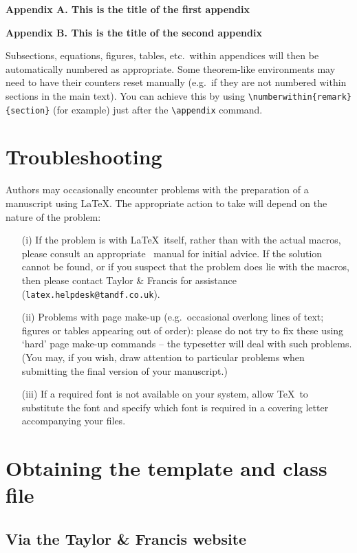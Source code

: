 \documentclass[]{interact}
\theoremstyle{plain}%
\theoremstyle{definition}
\theoremstyle{remark}
\begin{document}
\noindent\textbf{Appendix A. This is the title of the first appendix}\medskip

\noindent\textbf{Appendix B. This is the title of the second appendix}\medskip

\noindent Subsections, equations, figures, tables, etc.\ within appendices will then be automatically numbered as appropriate. Some theorem-like environments may need to have their counters reset manually (e.g.\ if they are not numbered within sections in the main text). You can achieve this by using \verb"\numberwithin{remark}{section}" (for example) just after the \verb"\appendix" command.


\appendix

\section{Troubleshooting}

Authors may occasionally encounter problems with the preparation of a manuscript using \LaTeX. The appropriate action to take will depend on the nature of the problem:
\begin{enumerate}
\item[(i)] If the problem is with \LaTeX\ itself, rather than with the actual macros, please consult an appropriate \LaTeXe\ manual for initial advice. If the solution cannot be found, or if you suspect that the problem does lie with the macros, then please contact Taylor \& Francis for assistance (\texttt{latex.helpdesk@tandf.co.uk}).
\item[(ii)] Problems with page make-up (e.g.\ occasional overlong lines of text; figures or tables appearing out of order): please do not try to fix these using `hard' page make-up commands -- the typesetter will deal with such problems. (You may, if you wish, draw attention to particular problems when submitting the final version of your manuscript.)
\item[(iii)] If a required font is not available on your system, allow \TeX\ to substitute the font and specify which font is required in a covering letter accompanying your files.
\end{enumerate}


\section{Obtaining the template and class file}

\subsection{Via the Taylor \& Francis website}
\end{document}
